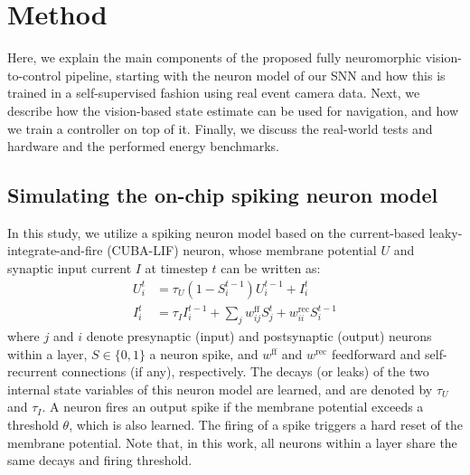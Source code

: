 \section{Method}

Here, we explain the main components of the proposed fully neuromorphic vision-to-control pipeline, starting with the neuron model of our SNN and how this is trained in a self-supervised fashion using real event camera data. Next, we describe how the vision-based state estimate can be used for navigation, and how we train a controller on top of it. Finally, we discuss the real-world tests and hardware and the performed energy benchmarks.

\subsection*{Simulating the on-chip spiking neuron model}

In this study, we utilize a spiking neuron model based on the current-based leaky-integrate-and-fire (CUBA-LIF) neuron, whose membrane potential $U$ and synaptic input current $I$ at timestep $t$ can be written as:
\begin{align}
    U^{t}_{i} &= \tau_U (1 - S^{t-1}_{i}) U^{t-1}_{i} + I^{t}_{i} \\
    I^{t}_{i} &= \tau_I I^{t-1}_{i} + \sum_j w_{ij}^{\text{ff}} S_j^{t} + w_{ii}^{\text{rec}} S_i^{t-1}
\end{align}
where $j$ and $i$ denote presynaptic (input) and postsynaptic (output) neurons within a layer, $S \in \{0, 1\}$ a neuron spike, and $w^{\text{ff}}$ and $w^{\text{rec}}$ feedforward and self-recurrent connections (if any), respectively. The decays (or leaks) of the two internal state variables of this neuron model are learned, and are denoted by $\tau_U$ and $\tau_I$. A neuron fires an output spike if the membrane potential exceeds a threshold $\theta$, which is also learned. The firing of a spike triggers a hard reset of the membrane potential. Note that, in this work, all neurons within a layer share the same decays and firing threshold.

